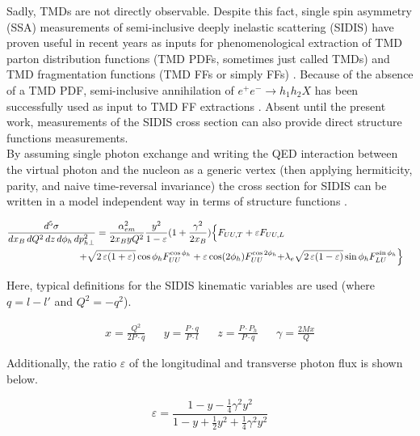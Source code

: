 Sadly, TMDs are not directly observable.  Despite this fact, single spin asymmetry (SSA) measurements of semi-inclusive deeply inelastic scattering (SIDIS) have proven useful in recent years as inputs for phenomenological extraction of TMD parton distribution functions (TMD PDFs, sometimes just called TMDs) and TMD fragmentation functions (TMD FFs or simply FFs) \cite{tmds-airapetian:2009, tmds-airapetian:2012, tmds-aghasyan:2017}.  Because of the absence of a TMD PDF, semi-inclusive annihilation of $e^+ e^- \rightarrow h_1 h_2 X$ has been successfully used as input to TMD FF extractions \cite{tmds-anselmino:2015}.  Absent until the present work, measurements of the SIDIS cross section can also provide direct structure functions measurements. \\

By assuming single photon exchange and writing the QED interaction between the virtual photon and the nucleon as a generic vertex (then applying hermiticity, parity, and naive time-reversal invariance) the cross section for SIDIS can be written in a model independent way in terms of structure functions \cite{tmds-mulders:1995, tmds-bacchetta:2006}.  

\begin{eqnarray}
  \frac{d^5\sigma}{dx_B \, dQ^{2}\, dz\, d\phi_h\, d p_{h\perp}^2} = \frac{\alpha^2_{em}}{2x_B y Q^2} \frac{y^2}{1-\varepsilon}  ( 1+\frac{\gamma^2}{2x_B} ) \Bigl\{ F_{UU ,T} +  \varepsilon F_{UU ,L} \nonumber \\
  + \sqrt{2\,\varepsilon (1+\varepsilon)} \cos\phi_h F_{UU}^{\cos\phi_h}+ \varepsilon \cos(2\phi_h) F_{UU}^{\cos 2\phi_h} +& \lambda_e
\sqrt{2\,\varepsilon (1-\varepsilon)} \sin\phi_h F_{LU}^{\sin\phi_h} \Bigr\}
\end{eqnarray}

Here, typical definitions for the SIDIS kinematic variables are used (where $q = l - l'$ and $Q^{2} = -q^{2}$). 

\begin{align}
  x = \frac{Q^{2}}{2P \cdot q} && y = \frac{P \cdot q}{P \cdot l} && z = \frac{P \cdot P_{h}}{P \cdot q} && \gamma = \frac{2Mx}{Q}
\end{align}

Additionally, the ratio $\varepsilon$ of the longitudinal and transverse photon flux is shown below.

\begin{equation}
	\varepsilon = \frac{1 - y - \frac{1}{4}\gamma^2 y^2}{1 - y + \frac{1}{2}y^2 + \frac{1}{4}\gamma^2 y^2}
\end{equation}

